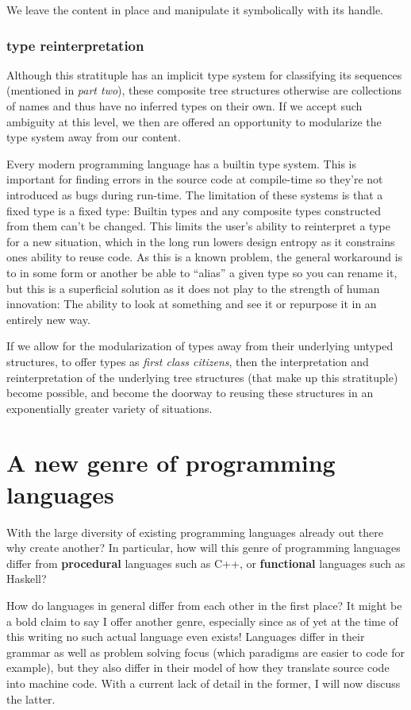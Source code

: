 \documentclass[twoside]{article}
\begin{document}
We leave the content in place and manipulate it symbolically with its handle.

\subsubsection*{type reinterpretation}

Although this stratituple has an implicit type system for classifying its sequences (mentioned in \emph{part two}),
these composite tree structures otherwise are collections of names and thus have no inferred types on their own.
If we accept such ambiguity at this level, we then are offered an opportunity to modularize the type system away
from our content.

Every modern programming language has a builtin type system. This is important for finding errors in the source code
at compile-time so they're not introduced as bugs during run-time. The limitation of these systems is that a fixed
type is a fixed type: Builtin types and any composite types constructed from them can't be changed. This limits
the user's ability to reinterpret a type for a new situation, which in the long run lowers design entropy as it
constrains ones ability to reuse code. As this is a known problem, the general workaround is to in some form or
another be able to ``alias'' a given type so you can rename it, but this is a superficial solution as it does not
play to the strength of human innovation: The ability to look at something and see it or repurpose it in an
entirely new way.

If we allow for the modularization of types away from their underlying untyped structures, to offer types as
\emph{first class citizens}, then the interpretation and reinterpretation of the underlying tree structures
(that make up this stratituple) become possible, and become the doorway to reusing these structures in an
exponentially greater variety of situations.

\section*{A new genre of programming languages}

With the large diversity of existing programming languages already out there why create another? In particular,
how will this genre of programming languages differ from {\bf procedural} languages such as C++, or {\bf functional}
languages such as Haskell?

How do languages in general differ from each other in the first place? It might be a bold claim to say I offer another
genre, especially since as of yet at the time of this writing no such actual language even exists! Languages differ
in their grammar as well as problem solving focus (which paradigms are easier to code for example),
but they also differ in their model of how they translate source code into machine code. With a current lack of detail
in the former, I will now discuss the latter.
\end{document}
